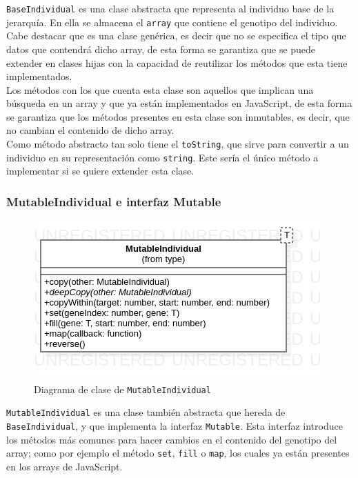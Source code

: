 \texttt{BaseIndividual} es una clase abstracta que representa al individuo base de la jerarquía. En ella se almacena el \texttt{array} que contiene el genotipo del individuo.
Cabe destacar que es una clase genérica, es decir que no se especifica el tipo que datos que contendrá dicho array, de esta forma se garantiza que se puede extender en clases hijas con la capacidad de reutilizar los métodos que esta tiene implementados. \\

Los métodos con los que cuenta esta clase son aquellos que implican una búsqueda en un array y que ya están implementados en JavaScript, de esta forma se garantiza que los métodos presentes en esta clase son inmutables, es decir, que no cambian el contenido de dicho array. \\

Como método abstracto tan solo tiene el \texttt{toString}, que sirve para convertir a un individuo en su representación como \texttt{string}. Este sería el único método a implementar si se quiere extender esta clase.

\subsubsection{MutableIndividual e interfaz Mutable}

\begin{figure}[ht]
    \centering
    \includegraphics[scale=0.6]{mem/images/cap-4/4.2.2(Individuos)/MutableIndividual.png}
    \caption{Diagrama de clase de \texttt{MutableIndividual}}
    \label{fig:mutableindividual-uml}
\end{figure}

\texttt{MutableIndividual} es una clase también abstracta que hereda de \texttt{BaseIndividual}, y que implementa la interfaz \texttt{Mutable}. Esta interfaz introduce los métodos más comunes para hacer cambios en el contenido del genotipo del array; como por ejemplo el método \texttt{set}, \texttt{fill} o \texttt{map}, los cuales ya están presentes en los arrays de JavaScript. \\

